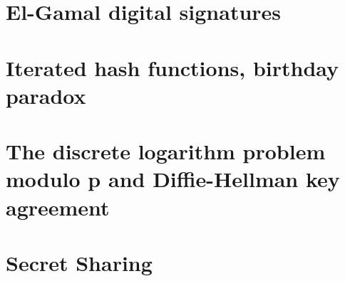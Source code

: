 \documentclass{article}
\begin{document}
\section{El-Gamal digital signatures}

\clearpage

\section{Iterated hash functions, birthday paradox}

\clearpage

\section{The discrete logarithm problem modulo p and Diffie-Hellman key agreement}

\clearpage

\section{Secret Sharing}

\end{document}
